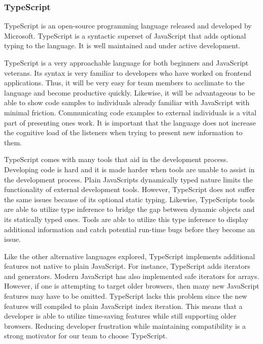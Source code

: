 \documentclass[12pt]{article}
\begin{document}
\subsubsection{TypeScript}

TypeScript is an open-source programming language released and developed by Microsoft. TypeScript is a syntactic superset of JavaScript that adds optional typing to the language.\cite{typescripthomepage} It is well maintained and under active development.

TypeScript is a very approachable language for both beginners and JavaScript veterans. Its syntax is very familiar to developers who have worked on frontend applications. Thus, it will be very easy for team members to acclimate to the language and become productive quickly. Likewise, it will be advantageous to be able to show code samples to individuals already familiar with JavaScript with minimal friction. Communicating code examples to external individuals is a vital part of presenting ones work. It is important that the language does not increase the cognitive load of the listeners when trying to present new information to them.

TypeScript comes with many tools that aid in the development process. Developing code is hard and it is made harder when tools are unable to assist in the development process. Plain JavaScripts dynamically typed nature limits the functionality of external development tools. However, TypeScript does not suffer the same issues because of its optional static typing. Likewise, TypeScripts tools are able to utilize type inference to bridge the gap between dynamic objects and its statically typed ones.\cite{typescripthomepage} Tools are able to utilize this type inference to display additional information and catch potential run-time bugs before they become an issue.

Like the other alternative languages explored, TypeScript implements additional features not native to plain JavaScript. For instance, TypeScript adds iterators and generators. Modern JavaScript has also implemented safe iterators for arrays. However, if one is attempting to target older browsers, then many new JavaScript features may have to be omitted. TypeScript lacks this problem since the new features will compiled to plain JavaScript index iteration. This means that a developer is able to utilize time-saving features while still supporting older browsers. Reducing developer frustration while maintaining compatibility is a strong motivator for our team to choose TypeScript.
\end{document}
